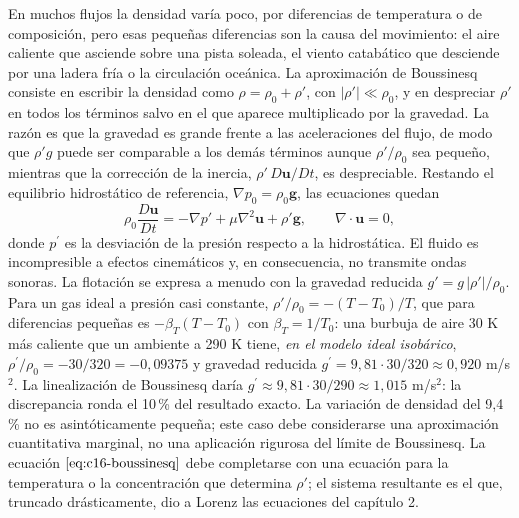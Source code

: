 \documentclass[10pt,openany]{book}
\begin{document}
En muchos flujos la densidad varía poco, por diferencias de temperatura o de composición, pero esas pequeñas diferencias son la causa del movimiento: el aire caliente que asciende sobre una pista soleada, el viento catabático que desciende por una ladera fría o la circulación oceánica. La aproximación de Boussinesq consiste en escribir la densidad como \(\rho = \rho_0 + \rho'\), con \(|\rho'| \ll \rho_0\), y en despreciar \(\rho'\) en todos los términos salvo en el que aparece multiplicado por la gravedad. La razón es que la gravedad es grande frente a las aceleraciones del flujo, de modo que \(\rho' g\) puede ser comparable a los demás términos aunque \(\rho'/\rho_0\) sea pequeño, mientras que la corrección de la inercia, \(\rho'\,D\mathbf{u}/Dt\), es despreciable. Restando el equilibrio hidrostático de referencia, \(\nabla p_0 = \rho_0\mathbf{g}\), las ecuaciones quedan
\begin{equation}
\rho_0\frac{D\mathbf{u}}{Dt} = -\nabla p' + \mu\nabla^{2}\mathbf{u} + \rho'\mathbf{g}, \qquad \nabla\cdot\mathbf{u} = 0, \label{eq:c16-boussinesq}
\end{equation}
donde \(p^{\prime}\) es la desviación de la presión respecto a la hidrostática. El fluido es incompresible a efectos cinemáticos y, en consecuencia, no transmite ondas sonoras. La flotación se expresa a menudo con la gravedad reducida \(g' = g\,|\rho'|/\rho_0\). Para un gas ideal a presión casi constante, \(\rho'/\rho_0 = -(T - T_0)/T\), que para diferencias pequeñas es \(-\beta_T(T - T_0)\) con \(\beta_T = 1/T_0\): una burbuja de aire 30 K más caliente que un ambiente a 290 K tiene, \emph{en el modelo ideal isobárico}, \(\rho^{\prime}/\rho_0=-30/320=-0{,}09375\) y gravedad reducida \(g^{\prime}=9{,}81\cdot30/320\approx0{,}920\) m/s\(^2\). La linealización de Boussinesq daría \(g^{\prime}\approx9{,}81\cdot30/290\approx1{,}015\) m/s\(^2\): la discrepancia ronda el 10\,\% del resultado exacto. La variación de densidad del 9,4\,\% no es asintóticamente pequeña; este caso debe considerarse una aproximación cuantitativa marginal, no una aplicación rigurosa del límite de Boussinesq. La ecuación \(\eqref{eq:c16-boussinesq}\) debe completarse con una ecuación para la temperatura o la concentración que determina \(\rho'\); el sistema resultante es el que, truncado drásticamente, dio a Lorenz las ecuaciones del capítulo 2.
\end{document}
